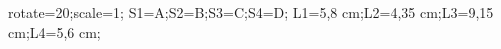 \documentclass[exercice]{thedocument}%
\begin{document}
%
    \>rotate=20;\>scale=1;%
    \>S1=A;\>S2=B;\>S3=C;\>S4=D;%
    \>L1=\small 5,8 cm;\>L2=\small 4,35 cm;\>L3=\small 9,15 cm;\>L4=\small 5,6 cm;%
\end{document}
